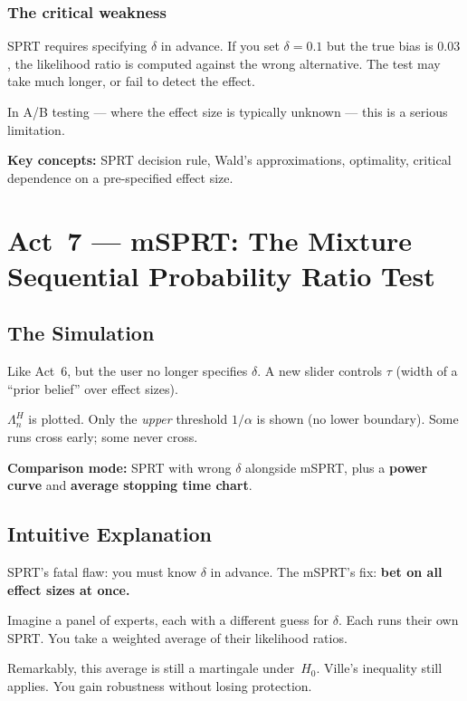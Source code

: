\documentclass[12pt, a4paper]{article}
\newcommand{\LR}{\Lambda}              %
\begin{document}
\subsubsection*{The critical weakness}

SPRT requires specifying $\delta$ in advance.  If you set $\delta = 0.1$ but
the true bias is $0.03$, the likelihood ratio is computed against the wrong
alternative.  The test may take much longer, or fail to detect the effect.

In A/B testing --- where the effect size is typically unknown --- this is a
serious limitation.

\begin{keytakeaway}
\textbf{Key concepts:} SPRT decision rule, Wald's approximations, optimality,
critical dependence on a pre-specified effect size.
\end{keytakeaway}


\newpage
\section{Act~7 --- mSPRT: The Mixture Sequential Probability Ratio Test}

\subsection{The Simulation}

\begin{simulation}
Like Act~6, but the user no longer specifies $\delta$.  A new slider
controls $\tau$ (width of a ``prior belief'' over effect sizes).

$\LR_n^{H}$ is plotted.  Only the \emph{upper} threshold $1/\alpha$ is
shown (no lower boundary).  Some runs cross early; some never cross.

\textbf{Comparison mode:} SPRT with wrong $\delta$ alongside mSPRT,
plus a \textbf{power curve} and \textbf{average stopping time chart}.
\end{simulation}

\subsection{Intuitive Explanation}

\begin{intuition}
SPRT's fatal flaw: you must know $\delta$ in advance.  The mSPRT's fix:
\textbf{bet on all effect sizes at once.}

Imagine a panel of experts, each with a different guess for $\delta$.  Each
runs their own SPRT.  You take a weighted average of their likelihood ratios.

Remarkably, this average is still a martingale under~$H_0$.  Ville's
inequality still applies.  You gain robustness without losing protection.
\end{intuition}
\end{document}
